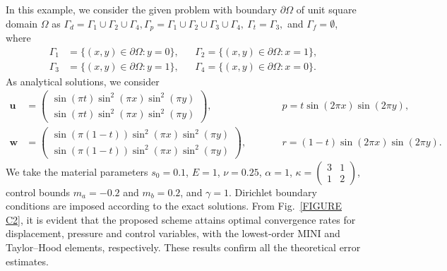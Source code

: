 \documentclass{amsart}
\newcommand{\jjl}[1]{\textcolor{purple}{JJL: #1}}
\begin{document}
In this example, we consider the given problem with boundary $\partial \Omega$ of unit square domain $\Omega$ as $\Gamma_d = \Gamma_1 \cup \Gamma_2 \cup \Gamma_4,
\Gamma_p = \Gamma_1 \cup \Gamma_2 \cup \Gamma_3 \cup \Gamma_4,\
\Gamma_t = \Gamma_3,$ and $
\Gamma_f = \emptyset$, where
\begin{align*}
	\Gamma_1 &= \{(x,y)\in \partial \Omega: y=0\}, &&\Gamma_2 = \{(x,y)\in \partial \Omega: x=1\},\\
	\Gamma_3 &= \{(x,y)\in \partial \Omega: y=1\}, &&\Gamma_4 = \{(x,y)\in \partial \Omega: x=0\}.
\end{align*} 
As analytical solutions, we consider \vspace{-2mm}
\begin{align*}
	\boldsymbol{u} &=  \begin{pmatrix}
	\sin(\pi t)\sin^2(\pi x) \sin^2(\pi y)\\
	\sin(\pi t)\sin^2(\pi x) \sin^2(\pi y)
	\end{pmatrix}, \qquad &&p = t \sin(2\pi x) \sin(2\pi y),\\
	\boldsymbol{w} &= \begin{pmatrix}
	\sin(\pi (1-t)) \sin^2(\pi x) \sin^2(\pi y)\\
	 \sin(\pi (1-t))\sin^2(\pi x) \sin^2(\pi y)
	\end{pmatrix},\qquad &&r = (1-t) \sin(2\pi x) \sin(2\pi y).
\end{align*}
We take the material parameters $s_{0} = 0.1$, $E=1$, $\nu=0.25$, $\alpha=1$, $\kappa =  \begin{pmatrix}
	3 &1\\
	1&2 
\end{pmatrix}$, control bounds $m_{a} = -0.2$ and $m_{b} = 0.2$, and $\gamma=1$. Dirichlet boundary conditions are imposed according to the exact solutions. From Fig.~\ref{FIGURE C2}, it is evident that the proposed scheme attains optimal convergence rates for displacement, pressure and control variables, with the lowest-order MINI and Taylor–Hood elements, respectively. These results confirm all the theoretical error estimates.
\end{document}

